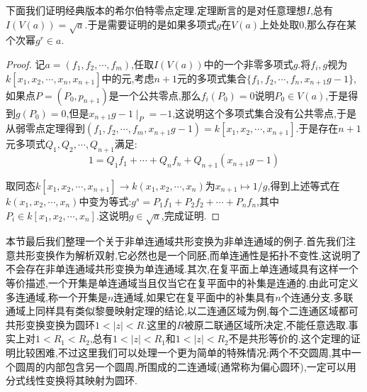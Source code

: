 下面我们证明经典版本的希尔伯特零点定理.定理断言的是对任意理想$I$,总有$I(V(a))=\sqrt{a}$.于是需要证明的是如果多项式$g$在$V(a)$上处处取0,那么存在某个次幂$g^r\in a$.
\begin{proof}
	
	记$a=(f_1,f_2,\cdots,f_m)$,任取$I(V(a))$中的一个非零多项式$g$.将$f_i,g$视为$k[x_1,x_2,\cdots,x_n,x_{n+1}]$中的元,考虑$n+1$元的多项式集合$\{f_1,f_2,\cdots,f_n,x_{n+1}g-1\}$,如果点$P=(P_0,p_{n+1})$是一个公共零点,那么$f_i(P_0)=0$说明$P_0\in V(a)$,于是得到$g(P_0)=0$,但是$x_{n+1}g-1\mid_P=-1$,这说明这个多项式集合没有公共零点,于是从弱零点定理得到$(f_1,f_2,\cdots,f_m,x_{n+1}g-1)=k[x_1,x_2,\cdots,x_{n+1}]$.于是存在$n+1$元多项式$Q_1,Q_2,\cdots,Q_{n+1}$满足:
	$$1=Q_1f_1+\cdots+Q_nf_n+Q_{n+1}(x_{n+1}g-1)$$
	
	取同态$k[x_1,x_2,\cdots,x_{n+1}]\to k(x_1,x_2,\cdots,x_n)$为$x_{n+1}\mapsto 1/g$,得到上述等式在$k(x_1,x_2,\cdots,x_n)$中变为等式:$g^s=P_1f_1+P_2f_2+\cdots+P_nf_n$,其中$P_i\in k[x_1,x_2,\cdots,x_n]$.这说明$g\in\sqrt{a}$,完成证明.
\end{proof}



本节最后我们整理一个关于非单连通域共形变换为非单连通域的例子.首先我们注意共形变换作为解析双射,它必然也是一个同胚,而单连通性是拓扑不变性,这说明了不会存在非单连通域共形变换为单连通域.其次,在复平面上单连通域具有这样一个等价描述,一个开集是单连通域当且仅当它在复平面中的补集是连通的.由此可定义多连通域,称一个开集是$n$连通域,如果它在复平面中的补集具有$n$个连通分支.多联通域上同样具有类似黎曼映射定理的结论,以二连通区域为例,每个二连通区域都可共形变换变换为圆环$1<|z|<R$.这里的$R$被原二联通区域所决定,不能任意选取.事实上对$1<R_1<R_2$,总有$1<|z|<R_1$和$1<|z|<R_2$不是共形等价的.这个定理的证明比较困难,不过这里我们可以处理一个更为简单的特殊情况:两个不交圆周,其中一个圆周的内部包含另一个圆周,所围成的二连通域(通常称为偏心圆环),一定可以用分式线性变换将其映射为圆环.


